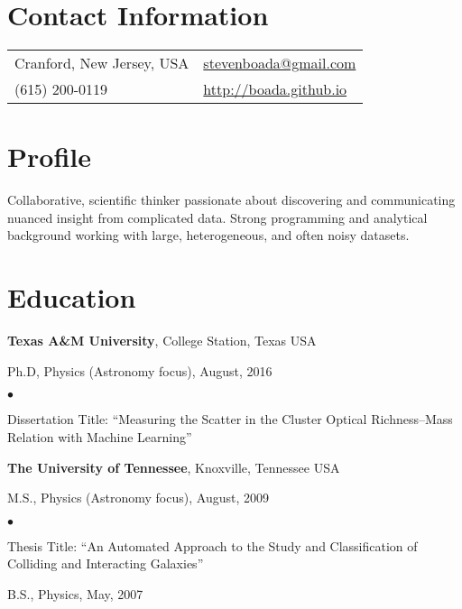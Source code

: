 \documentclass[margin,line, 11pt]{res}
\newenvironment{list1}{
  \begin{list}{\ding{113}}{%
      \setlength{\itemsep}{0in}
      \setlength{\parsep}{0in} \setlength{\parskip}{0in}
      \setlength{\topsep}{0in} \setlength{\partopsep}{0in}
      \setlength{\leftmargin}{0.17in}}}{\end{list}}
\newenvironment{list2}{
  \begin{list}{$\bullet$}{%
      \setlength{\itemsep}{0in}
      \setlength{\parsep}{0in} \setlength{\parskip}{0in}
      \setlength{\topsep}{0in} \setlength{\partopsep}{0in}
      \setlength{\leftmargin}{0.2in}}}{\end{list}}
\begin{document}

\begin{resume}
\section{Contact Information}
\begin{tabular}{@{}p{3in}p{3in}}
Cranford, New Jersey, USA & \href{mailto:stevenboada@gmail.com}{stevenboada@gmail.com} \\
(615) 200-0119   & \url{http://boada.github.io} \\
\end{tabular}
\vspace*{-6mm}

\section{Profile}
Collaborative, scientific thinker passionate about discovering and communicating nuanced insight from complicated data. Strong programming and analytical background working with large, heterogeneous, and often noisy datasets.
\vspace*{-5mm}

\section{Education}
\textbf{Texas A\&M University}, College Station, Texas USA\\
\vspace*{-5mm}
\begin{list1}
	\item[]Ph.D, Physics (Astronomy focus), August, 2016
	\begin{list2}
		\item Dissertation Title: ``Measuring the Scatter in the Cluster Optical Richness--Mass Relation with Machine Learning''
	\end{list2}
\end{list1}
\vspace*{-5mm}

\textbf{The University of Tennessee}, Knoxville, Tennessee USA\\
\vspace*{-5mm}
\begin{list1}
	\item[] M.S., Physics (Astronomy focus),  August, 2009
	\begin{list2}
		\item Thesis Title: ``An Automated Approach to the Study and Classification of Colliding and Interacting Galaxies''
	\end{list2}
	\item[] B.S., Physics,  May, 2007
\end{list1}
\vspace*{-5mm}


\end{resume}
\end{document}
